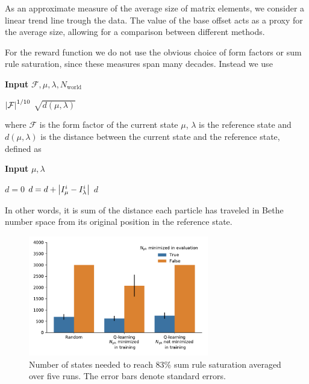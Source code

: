 \documentclass[11pt, a4paper]{report} %
\begin{document}
As an approximate measure of the average size of matrix elements, we consider a linear trend line trough the data.
The value of the base offset acts as a proxy for the average size, allowing for a comparison between different methods.

For the reward function we do not use the obvious choice of form factors or sum rule saturation, since these measures span many decades.
Instead we use
\begin{algorithm}[H]
   \hspace*{\algorithmicindent} \textbf{Input} $\mathcal{F}, \mu, \lambda, N_{\mathrm{world}}$ 
   \begin{algorithmic}[1]
     \State \Return $\abs{\mathcal{F}}^{1/10}$
     \State \Return $\sqrt{d(\mu, \lambda)}$
     \Else{}
     \State {}
     \EndIf{}
  \end{algorithmic}
\end{algorithm}
\noindent
where \(\mathcal{F}\) is the form factor of the current state \(\mu\), \(\lambda\) is the reference state and \(d(\mu, \lambda)\) is the distance between the current state and the reference state, defined as
\begin{algorithm}[H]
   \hspace*{\algorithmicindent} \textbf{Input} $\mu, \lambda$ 
   \begin{algorithmic}[1]
     \State $d = 0$
     \vspace{3mm}
     \State $d = d + \abs{I_{\mu}^i-I_{\lambda}^i}$
     \EndFor{}
     \State \Return $d$
  \end{algorithmic}
\end{algorithm}
\noindent
In other words, it is sum of the distance each particle has traveled in Bethe number space from its original position in the reference state.



\begin{figure}[tb!]
  \centering
  \includegraphics[width=0.7\textwidth]{statestoconv.pdf}
  \caption{Number of states needed to reach 83\% sum rule saturation averaged over five runs. The error bars denote standard errors.}
  \label{fig:statestoconv}
\end{figure}
\end{document}
